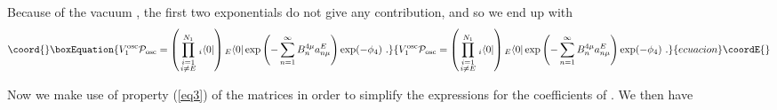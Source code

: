\documentclass[a4paper,11pt]{article}
\begin{document}
Because of the vacuum \coordHE{}, the first two exponentials do not give any contribution, and so we end up with
\begin{equation}\coord{}\boxEquation{
V^{\rm osc}_1{\cal P}_{\rm osc}=\left( \prod_{\scriptstyle i=1\atop \scriptstyle i\neq E}^{N_1}{ }_i\langle 0|\right) { }_E\langle 0|\exp \left( -\sum_{n=1}^\infty B^{4\mu }_na^E_{n\mu }\right) \exp (-\phi _4)\ .
}{
V^{\rm osc}_1{\cal P}_{\rm osc}=\left( \prod_{\scriptstyle i=1\atop \scriptstyle i\neq E}^{N_1}{ }_i\langle 0|\right) { }_E\langle 0|\exp \left( -\sum_{n=1}^\infty B^{4\mu }_na^E_{n\mu }\right) \exp (-\phi _4)\ .
}{ecuacion}\coordE{}\end{equation}

Now we make use of property (\ref{eq3}) of the \coordHE{} matrices in order to simplify the expressions for the coefficients of \coordHE{}. We then have
\end{document}
